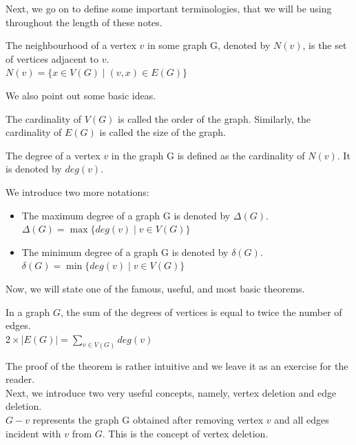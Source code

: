 \documentclass[../basic_graph_theory.tex]{subfiles}
\begin{document}
Next, we go on to define some important terminologies, that we will be using throughout the length of these notes.
\begin{defn}
    The neighbourhood of a vertex $v$ in some graph G, denoted by $N(v)$, is the set of vertices adjacent to $v$.\\
    $N(v) = \{x \in V(G) \mid (v,x) \in E(G)\}$
\end{defn}

We also point out some basic ideas.
\begin{defn}
    The cardinality of $V(G)$ is called the order of the graph. Similarly, the cardinality of $E(G)$ is called the size of the graph.
\end{defn}

\begin{defn}
    The degree of a vertex $v$ in the graph G is defined as the cardinality of $N(v)$. It is denoted by $deg(v)$.
\end{defn}

We introduce two more notations:
\begin{itemize}
    \item The maximum degree of a graph G is denoted by $\Delta(G)$.\\
          $\Delta(G) = \max\{deg(v) \mid v \in V(G)\}$
    \item The minimum degree of a graph G is denoted by $\delta(G)$.\\
          $\delta(G) = \min\{deg(v) \mid v \in V(G)\}$
\end{itemize}

Now, we will state one of the famous, useful, and most basic theorems.
\begin{thm}
    In a graph $G$, the sum of the degrees of vertices is equal to twice the number of edges.\\
    $2 \times |E(G)|=\sum_{v \in V(G)}deg(v)$
\end{thm}

The proof of the theorem is rather intuitive and we leave it as an exercise for the reader.\\

Next, we introduce two very useful concepts, namely, vertex deletion and edge deletion.\\

$G-v$ represents the graph G obtained after removing vertex $v$ and all edges incident with $v$ from $G$. This is the concept of vertex deletion.\\
\end{document}

